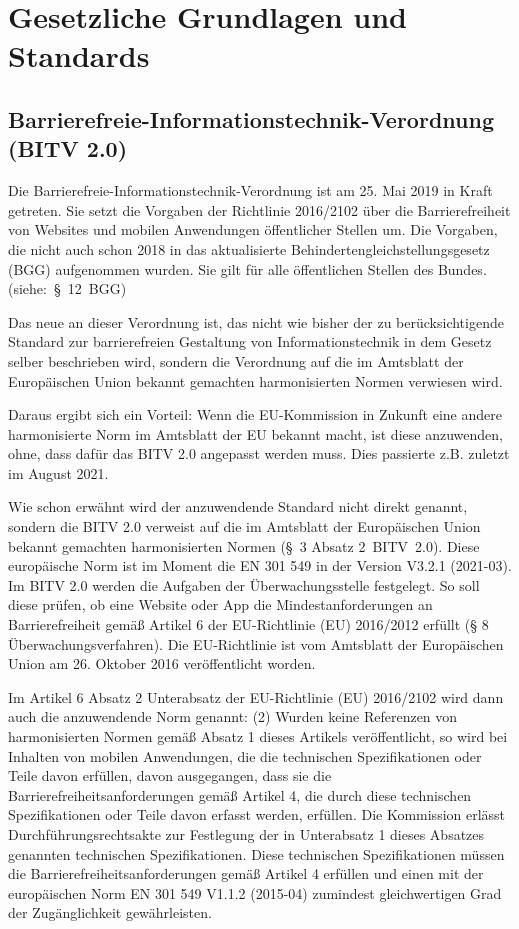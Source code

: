 \section{Gesetzliche Grundlagen und Standards}
\subsection{Barrierefreie-Informationstechnik-Verordnung (BITV 2.0)}
Die Barrierefreie-Informationstechnik-Verordnung ist am 25. Mai 2019 in Kraft getreten. Sie setzt die Vorgaben der Richtlinie 2016/2102 über die Barrierefreiheit von Websites und mobilen Anwendungen öffentlicher Stellen um. Die Vorgaben, die nicht auch schon 2018 in das aktualisierte Behindertengleichstellungsgesetz (BGG) aufgenommen wurden. 
Sie gilt für alle öffentlichen Stellen des Bundes. (siehe: § 12 BGG)

Das neue an dieser Verordnung ist, das nicht wie bisher der zu berücksichtigende Standard zur barrierefreien Gestaltung von Informationstechnik in dem Gesetz selber beschrieben wird, sondern die Verordnung auf die im Amtsblatt der Europäischen Union bekannt gemachten harmonisierten Normen verwiesen wird. 

Daraus ergibt sich ein Vorteil: Wenn die EU-Kommission in Zukunft eine andere harmonisierte Norm im Amtsblatt der EU bekannt macht, ist diese anzuwenden, ohne, dass dafür das BITV 2.0 angepasst werden muss. Dies passierte z.B. zuletzt im August 2021.

Wie schon erwähnt wird der anzuwendende Standard nicht direkt genannt, sondern die BITV 2.0 verweist auf die im Amtsblatt der Europäischen Union bekannt gemachten harmonisierten Normen (§ 3 Absatz 2 BITV 2.0). Diese europäische Norm ist im Moment die EN 301 549 in der Version V3.2.1 (2021-03). Im BITV 2.0 werden die Aufgaben der Überwachungsstelle festgelegt. So soll diese prüfen, ob eine Website oder App die Mindestanforderungen an Barrierefreiheit gemäß Artikel 6 der EU-Richtlinie (EU) 2016/2012 erfüllt (§ 8 Überwachungsverfahren). Die EU-Richtlinie ist vom Amtsblatt der Europäischen Union am 26. Oktober 2016 veröffentlicht worden.

Im Artikel 6 Absatz 2 Unterabsatz der EU-Richtlinie (EU) 2016/2102 wird dann auch die anzuwendende Norm genannt:
(2) Wurden keine Referenzen von harmonisierten Normen gemäß Absatz 1 dieses Artikels veröffentlicht, so wird bei Inhalten von mobilen Anwendungen, die die technischen Spezifikationen oder Teile davon erfüllen, davon ausgegangen, dass sie die Barrierefreiheitsanforderungen gemäß Artikel 4, die durch diese technischen Spezifikationen oder Teile davon erfasst werden, erfüllen. 
Die Kommission erlässt Durchführungsrechtsakte zur Festlegung der in Unterabsatz 1 dieses Absatzes genannten technischen Spezifikationen. Diese technischen Spezifikationen müssen die Barrierefreiheitsanforderungen gemäß Artikel 4 erfüllen und einen mit der europäischen Norm EN 301 549 V1.1.2 (2015-04) zumindest gleichwertigen Grad der Zugänglichkeit gewährleisten.

